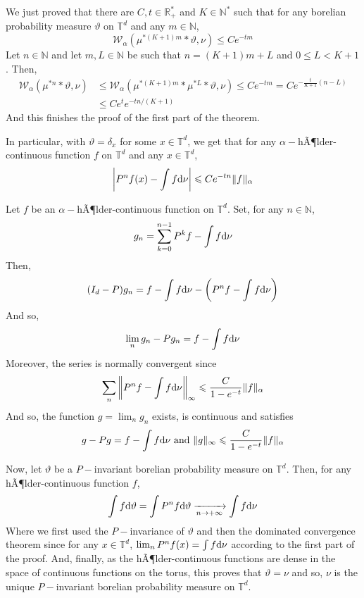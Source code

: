 \documentclass[11pt]{amsart}
\theoremstyle{definition}
\theoremstyle{remark}
\numberwithin{equation}{section}
\begin{document}
We just proved that there are $C,t\in {\mathbb R}_+^\ast$ and $K\in {\mathbb N}^\ast$ such that for any borelian probability measure $\vartheta$ on ${\mathbb T}^d$ and any $m\in {\mathbb N}$,
\[
\mathcal{W}_\alpha\left( \mu^{\ast (K+1)m} \ast \vartheta,\nu\right) \leqslant Ce^{-tm}
\]
Let $n\in {\mathbb N}$ and let $m,L\in {\mathbb N}$ be such that $n=(K+1)m+L$ and $0\leqslant L< K+1$. Then,
\begin{align*}
\mathcal{W}_\alpha\left( \mu^{\ast n} \ast \vartheta,\nu\right) &\leqslant \mathcal{W}_\alpha\left( \mu^{\ast (K+1)m} \ast \mu^{\ast L}\ast\vartheta,\nu\right) \leqslant C e^{-tm} = Ce^{-\frac t {K+1} (n-L)} \\
&\leqslant C e^t e^{-tn/(K+1)}
\end{align*}
And this finishes the proof of the first part of the theorem.

\medskip
In particular, with $\vartheta= \delta_x$ for some $x\in {\mathbb T}^d$, we get that for any $\alpha-$hÃ¶lder-continuous function $f$ on ${\mathbb T}^d$ and any $x\in {\mathbb T}^d$,
\[
\left|P^n f(x) - \int f{{\rm d}}\nu\right| \leqslant Ce^{-tn} \|f\|_\alpha
\]

Let $f$ be an $\alpha-$hÃ¶lder-continuous function on ${\mathbb T}^d$. Set, for any $n\in {\mathbb N}$,
\[
g_n=\sum_{k=0}^{n-1} P^k f-\int f{{\rm d}}\nu
\]
Then,
\[
(I_d-P)g_n = f-\int f{{\rm d}}\nu - \left(P^n f -\int f{{\rm d}}\nu \right)
\]
And so,
\[
\lim_n g_n - Pg_n = f-\int f{{\rm d}}\nu
\]
Moreover, the series is normally convergent since
\[
\sum_n  \left\| P^nf - \int f{{\rm d}}\nu\right\|_\infty \leqslant \frac{C}{1-e^{-t}} \|f\|_\alpha
\]
And so, the function $g=\lim_n g_n$ exists, is continuous and satisfies
\[
g-Pg=f-\int f{{\rm d}}\nu\text{ and }\|g\|_\infty \leqslant  \frac{C}{1-e^{-t}} \|f\|_\alpha
\]

Now, let $\vartheta$ be a $P-$invariant borelian probability measure on ${\mathbb T}^d$. Then, for any hÃ¶lder-continuous function $f$,
\[
 \int f{{\rm d}} \vartheta = \int P^n f {{\rm d}}\vartheta \xrightarrow[n\to +\infty]\, \int f{{\rm d}}\nu
\]
Where we first used the $P-$invariance of $\vartheta$ and then the dominated convergence theorem since for any $x\in {\mathbb T}^d$, $\lim_n P^n f(x) = \int f{{\rm d}}\nu$ according to the first part of the proof. And, finally, as the hÃ¶lder-continuous functions are dense in the space of continuous functions on the torus, this proves that $\vartheta = \nu$ and so, $\nu$ is the unique $P-$invariant borelian probability measure on ${\mathbb T}^d$. 
\end{document}
